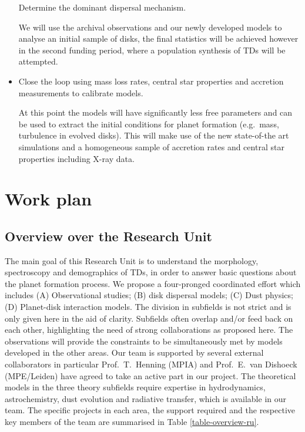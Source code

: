 \documentclass[10pt,fleqn,twoside]{article}
\begin{document}
\begin{itemize}
\begin{Emphasize}
  Determine the dominant dispersal mechanism.
\end{Emphasize}
We will
use the archival observations and our newly developed models to analyse
an initial sample of disks, the final statistics will be achieved
however in the second funding period, where a population synthesis of
TDs will be attempted.
\item 
\begin{Emphasize}
  Close the loop using mass loss rates, central star properties and
  accretion measurements to calibrate models.
\end{Emphasize}
At this
point the models will have significantly less free parameters and can
be used to extract the initial conditions for planet formation
(e.g.\ mass, turbulence in evolved disks). This will make use of the new state-of-the
art simulations and a homogeneous sample of accretion rates and central
star properties including X-ray data. 
\end{itemize}

\section{Work plan}

\subsection{Overview over the Research Unit}
%
The main goal of this Research Unit is to understand the morphology,
spectroscopy and demographics of TDs, in order to answer
basic questions about the planet formation process. We propose a
four-pronged coordinated effort which includes (A) Observational
studies; (B) disk dispersal models; (C) Dust physics; (D) Planet-disk
interaction models. The division in subfields is not strict and is
only given here in the aid of clarity. Subfields often overlap and/or
feed back on each other, highlighting the need of strong
collaborations as proposed here. The observations will provide the
constraints to be simultaneously met by models developed in the other
areas. Our team is supported by several external collaborators in particular
Prof.\ T.\ Henning (MPIA) and Prof.\ E.\ van Dishoeck (MPE/Leiden) have
agreed to take an active part in our project. The theoretical models in the three theory subfields require
expertise in hydrodynamics, astrochemistry, dust evolution and
radiative transfer, which is available in our team. The specific
projects in each area, the support required and the respective key members
of the team are summarised in Table \ref{table-overview-ru}.
\end{document}
